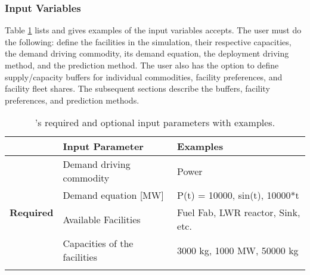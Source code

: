 \subsubsection{\textbf{Input Variables}}
Table \ref{tab:inputs} lists and gives examples of the input 
variables \deploy accepts. 
The user must do the following: 
define the facilities in the simulation, their respective 
capacities, the demand driving commodity,
its demand equation, the deployment driving method, 
and the prediction method. 
The user also has the option to define supply/capacity buffers 
for individual commodities, facility preferences, and facility 
fleet shares. 
The subsequent sections describe 
the buffers, facility preferences, and prediction methods. 

\begin{table}[]
    \centering
    \doublespacing
    \caption{\deploy's required and optional input parameters with examples.}
    \label{tab:inputs}
        \small
        \begin{tabular}{l|ll}
        \hline
            & \textbf{Input Parameter}                                                           & \textbf{Examples}                                                                                                          \\ \hline
            \multirow{5}{*}{\textbf{Required}} & Demand driving commodity                                                           & Power                                                                                                                      \\ \cline{2-3} 
                                                      & Demand equation [MW]                                                                   & P(t) = 10000, sin(t), 10000*t                                                                                                                 \\ \cline{2-3} 
                                                      & Available Facilities                                                             & Fuel Fab, LWR reactor, Sink, etc.                                                                                                      \\ \cline{2-3} 
                                                      & Capacities of the facilities                                                       & 3000 kg, 1000 MW, 50000 kg                                                                                                     \\ \cline{2-3} 

\end{tabular}
\end{table}
